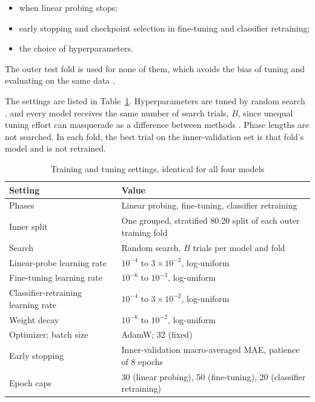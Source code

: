 \documentclass{icsthesis}
\begin{document}
\begin{mainmatter}
					\begin{itemize}
						\item when linear probing stops;
						\item early stopping and checkpoint selection in fine-tuning and classifier
							retraining;
						\item the choice of hyperparameters.
					\end{itemize}

					The outer test fold is used for none of them, which avoids the bias
					of tuning and evaluating on the same data
					\citep{cawley2010,raschka2018}.

					The settings are listed in Table~\ref{tab:training}. Hyperparameters are tuned by random search
					\citep{bergstra2012}, and every model receives the same number of search trials, $B$, since unequal
					tuning effort can masquerade as a difference between methods \citep{melis2018}. Phase lengths are not
					searched. In each fold, the best trial on the inner-validation set is that fold's model and is not
					retrained.

					\begin{table}[htbp]
					\vspace{4ex}
					\centering
						\caption{Training and tuning settings, identical for all four models}
						\label{tab:training}
						\singlespacing\footnotesize
						\begin{tabular}{p{4.6cm}p{9.2cm}}
						\hline
						\hline
						Setting & Value \\ \hline
						Phases & Linear probing, fine-tuning, classifier retraining \\
						Inner split & One grouped, stratified 80:20 split of each outer training fold \\
						Search & Random search, $B$ trials per model and fold \\
						Linear-probe learning rate & $10^{-4}$ to $3 \times 10^{-2}$, log-uniform \\
						Fine-tuning learning rate & $10^{-6}$ to $10^{-3}$, log-uniform \\
						Classifier-retraining learning rate & $10^{-4}$ to $3 \times 10^{-2}$, log-uniform \\
						Weight decay & $10^{-6}$ to $10^{-2}$, log-uniform \\
						Optimizer; batch size & AdamW; 32 (fixed) \\
						Early stopping & Inner-validation macro-averaged MAE, patience of 8 epochs \\
						Epoch caps & 30 (linear probing), 50 (fine-tuning), 20 (classifier retraining) \\ \hline\hline
						\end{tabular}
					\vspace{4ex}
					\end{table}


\end{mainmatter}
\end{document}
